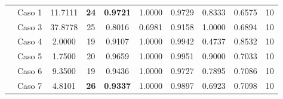 \begin{table}
{\begin{tabular}{cccccccccc}
			\multicolumn{1}{c|}{}                      & {\color[HTML]{003532} Caso 1} & {\color[HTML]{003532} 11.7111}                                       & {\color[HTML]{9A0000} \textbf{24}}                                 & {\color[HTML]{9A0000} \textbf{0.9721}}                  & {\color[HTML]{003532} 1.0000} & {\color[HTML]{003532} 0.9729} & {\color[HTML]{003532} 0.8333} & {\color[HTML]{003532} 0.6575} & {\color[HTML]{003532} 10}                                            \\
			\multicolumn{1}{c|}{}                      & Caso 3                        & 37.8778                                                              & 25                                                                 & 0.8016                                                  & 0.6981                        & 0.9158                        & 1.0000                        & 0.6894                        & 10                                                                   \\
			\multicolumn{1}{c|}{}                      & {\color[HTML]{003532} Caso 4} & {\color[HTML]{003532} 2.0000}                                        & {\color[HTML]{003532} 19}                                          & {\color[HTML]{003532} 0.9107}                           & {\color[HTML]{003532} 1.0000} & {\color[HTML]{003532} 0.9942} & {\color[HTML]{003532} 0.4737} & {\color[HTML]{003532} 0.8532} & {\color[HTML]{003532} 10}                                            \\
			\multicolumn{1}{c|}{}                      & Caso 5                        & 1.7500                                                               & 20                                                                 & 0.9659                                                  & 1.0000                        & 0.9951                        & 0.9000                        & 0.7033                        & 10                                                                   \\
			\multicolumn{1}{c|}{}                      & {\color[HTML]{003532} Caso 6} & {\color[HTML]{003532} 9.3500}                                        & {\color[HTML]{003532} 19}                                          & {\color[HTML]{003532} 0.9436}                           & {\color[HTML]{003532} 1.0000} & {\color[HTML]{003532} 0.9727} & {\color[HTML]{003532} 0.7895} & {\color[HTML]{003532} 0.7086} & {\color[HTML]{003532} 10}                                            \\
			\multicolumn{1}{c|}{}                      & Caso 7                        & 4.8101                                                               & {\color[HTML]{9A0000} \textbf{26}}                                 & {\color[HTML]{9A0000} \textbf{0.9337}}                  & 1.0000                        & 0.9897                        & 0.6923                        & 0.7098                        & 10                                                                   \\

\end{tabular}}
\end{table}
